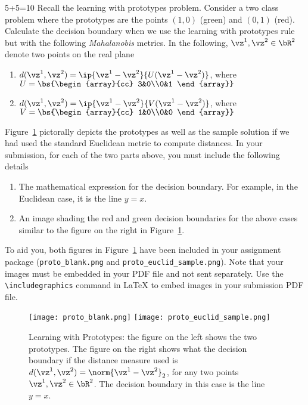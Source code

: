 \begin{mlproblem}{5+5=10}
Recall the learning with prototypes problem. Consider a two class problem where the prototypes are the points $(1,0)$ (green) and $(0,1)$ (red). Calculate the decision boundary when we use the learning with prototypes rule but with the following \emph{Mahalanobis} metrics. In the following, $\vz^1,\vz^2 \in \bR^2$ denote two points on the real plane
\begin{enumerate}
	\item $d(\vz^1,\vz^2) = \ip{\vz^1-\vz^2}{U(\vz^1-\vz^2)}$, where $U = \bs{\begin{array}{cc}
		3&0\\0&1
	\end{array}}$
	\item $d(\vz^1,\vz^2) = \ip{\vz^1-\vz^2}{V(\vz^1-\vz^2)}$, where $V = \bs{\begin{array}{cc}
		1&0\\0&0
	\end{array}}$
\end{enumerate}
Figure~\ref{fig:proto} pictorally depicts the prototypes as well as the sample solution if we had used the standard Euclidean metric to compute distances. In your submission, for each of the two parts above, you must include the following details
\begin{enumerate}
	\item The mathematical expression for the decision boundary. For example, in the Euclidean case, it is the line $y = x$.
	\item An image shading the red and green decision boundaries for the above cases similar to the figure on the right in Figure~\ref{fig:proto}.
\end{enumerate}
To aid you, both figures in Figure~\ref{fig:proto} have been included in your assignment package (\verb|proto_blank.png| and \verb|proto_euclid_sample.png|). Note that your images must be embedded in your PDF file and not sent separately. Use the \verb!\includegraphics! command in \LaTeX{} to embed images in your submission PDF file.
\begin{figure}[th]%
\centering
\texttt{[image: proto\_blank.png]}%
\hfill
\texttt{[image: proto\_euclid\_sample.png]}%
\caption{Learning with Prototypes: the figure on the left shows the two prototypes. The figure on the right shows what the decision boundary if the distance measure used is $d(\vz^1,\vz^2) = \norm{\vz^1-\vz^2}_2$, for any two points $\vz^1,\vz^2 \in \bR^2$. The decision boundary in this case is the line $y = x$.}%
\label{fig:proto}%
\end{figure}
\end{mlproblem}

